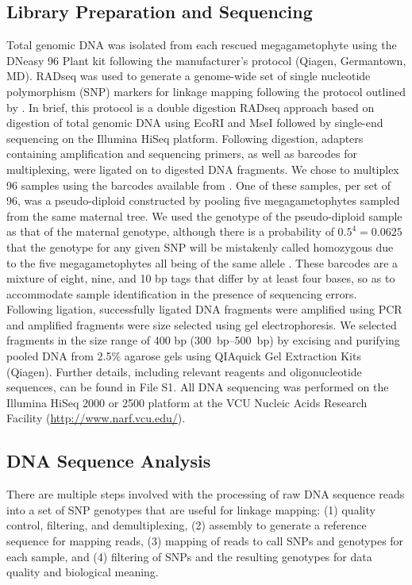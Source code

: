 \documentclass[11pt]{article}
\begin{document}
\subsection*{Library Preparation and Sequencing}\label{ss:library}

Total genomic DNA was isolated from each rescued megagametophyte using the DNeasy 96 Plant 
kit following the manufacturer’s protocol (Qiagen, Germantown, MD). RADseq \citep{Davey:2010, Parchman:2012, Peterson:2012} 
was used to generate a genome-wide set of 
single nucleotide polymorphism (SNP) markers for linkage mapping following the protocol 
outlined by \citet{Parchman:2012}. In brief, this protocol is a double digestion RADseq 
approach based on digestion of total genomic DNA using EcoRI and MseI followed by single-end 
sequencing on the Illumina HiSeq platform. Following digestion, adapters 
containing amplification and sequencing primers, as well as barcodes for multiplexing, 
were ligated on to digested DNA fragments. We chose to multiplex 96 samples using the 
barcodes available from \citet{Parchman:2012}. One of these samples, per set of 96, was a pseudo-diploid
constructed by pooling five megagametophytes sampled from the same maternal tree. We used the genotype of the
pseudo-diploid sample as that of the maternal genotype, although there is a probability of $0.5^{4} = 0.0625$ that 
the genotype for any given SNP will be mistakenly called homozygous due to the five megagametophytes all being of the 
same allele \citep[see][]{Morris:1978}.
These barcodes are a mixture of eight, nine, and  10 bp tags that differ by at least four bases, so as to accommodate
sample identification in the presence of sequencing errors. Following ligation, successfully ligated DNA fragments were 
amplified using PCR and amplified fragments were size selected using gel electrophoresis. We selected 
fragments in the size range of 400 bp (\SIrange{300}{500}{bp}) by excising and purifying pooled DNA from 2.5\% 
agarose gels using QIAquick Gel Extraction Kits (Qiagen). Further details, including relevant reagents and 
oligonucleotide sequences, can be found in File S1. All DNA sequencing was performed on the Illumina HiSeq 2000 or 2500
platform at the VCU Nucleic Acids Research Facility (\url{http://www.narf.vcu.edu/}).

\subsection*{DNA Sequence Analysis}\label{ss:dna}

There are multiple steps involved with the processing of raw DNA sequence reads into a set of SNP genotypes that are useful for linkage mapping:
(1) quality control, filtering, and demultiplexing, (2) assembly to generate a reference sequence for mapping reads, (3) mapping 
of reads to call SNPs and genotypes for each sample, and (4) filtering of SNPs and the resulting genotypes for
data quality and biological meaning.
\end{document}
